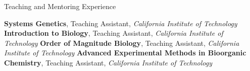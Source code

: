 \begin{rubric}{Teaching and Mentoring Experience}


\entry*[2017--2018]
	\textbf{Systems Genetics}, Teaching Assistant,
	\emph{California Institute of Technology}
\entry*[2016]
	\textbf{Introduction to Biology}, Teaching Assistant,
	\emph{California Institute of Technology}
\entry*[2015]
	\textbf{Order of Magnitude Biology}, Teaching Assistant,
	\emph{California Institute of Technology}
\entry*[2014]
	\textbf{Advanced Experimental Methods in Bioorganic Chemistry}, Teaching
	Assistant, \emph{California Institute of Technology}

\end{rubric}
